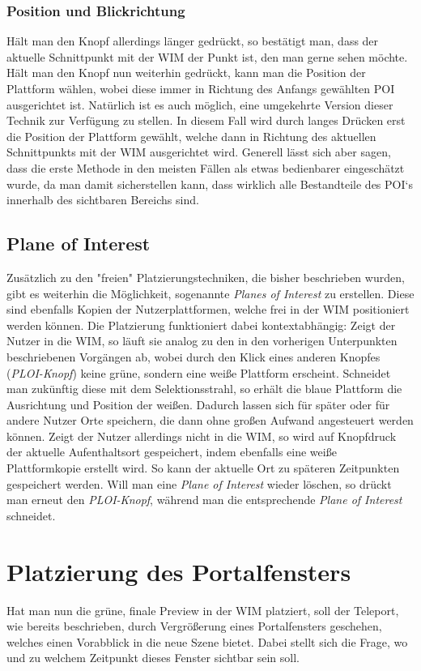 \subsubsection{Position und Blickrichtung}
Hält man den Knopf allerdings länger gedrückt, so bestätigt man, dass der aktuelle Schnittpunkt mit der WIM der Punkt ist, den man gerne sehen möchte. Hält man den Knopf nun weiterhin gedrückt, kann man die Position der Plattform wählen, wobei diese immer in Richtung des Anfangs gewählten POI ausgerichtet ist.
Natürlich ist es auch möglich, eine umgekehrte Version dieser Technik zur Verfügung zu stellen. In diesem Fall wird durch langes Drücken erst die Position der Plattform gewählt, welche dann in Richtung des aktuellen Schnittpunkts mit der WIM ausgerichtet wird. 
Generell lässt sich aber sagen, dass die erste Methode in den meisten Fällen als etwas bedienbarer eingeschätzt wurde, da man damit sicherstellen kann, dass wirklich alle Bestandteile des POI`s innerhalb des sichtbaren Bereichs sind.

\subsection{Plane of Interest}
Zusätzlich zu den "freien" Platzierungstechniken, die bisher beschrieben wurden, gibt es weiterhin die Möglichkeit, sogenannte \textit{Planes of Interest} zu erstellen. Diese sind ebenfalls Kopien der Nutzerplattformen, welche frei in der WIM positioniert werden können. Die Platzierung funktioniert dabei kontextabhängig:
Zeigt der Nutzer in die WIM, so läuft sie analog zu den in den vorherigen Unterpunkten beschriebenen Vorgängen ab, wobei durch den Klick eines anderen Knopfes (\textit{PLOI-Knopf}) keine grüne, sondern eine weiße Plattform erscheint. Schneidet man zukünftig diese mit dem Selektionsstrahl, so erhält die blaue Plattform die Ausrichtung und Position der weißen. Dadurch lassen sich für später oder für andere Nutzer Orte speichern, die dann ohne großen Aufwand angesteuert werden können.
Zeigt der Nutzer allerdings nicht in die WIM, so wird auf Knopfdruck der aktuelle Aufenthaltsort gespeichert, indem ebenfalls eine weiße Plattformkopie erstellt wird. So kann der aktuelle Ort zu späteren Zeitpunkten gespeichert werden.
Will man eine \textit{Plane of Interest} wieder löschen, so drückt man erneut den \textit{PLOI-Knopf}, während man die entsprechende \textit{Plane of Interest} schneidet.


\section{Platzierung des Portalfensters}
Hat man nun die grüne, finale Preview in der WIM platziert, soll der Teleport, wie bereits beschrieben, durch Vergrößerung eines Portalfensters geschehen, welches einen Vorabblick in die neue Szene bietet. Dabei stellt sich die Frage, wo und zu welchem Zeitpunkt dieses Fenster sichtbar sein soll.

